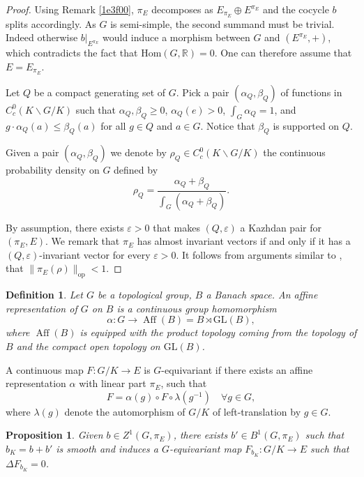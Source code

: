 \documentclass[12pt]{amsart}
\newtheorem{proposition}[theorem]{Proposition}
\newtheorem{definition}[theorem]{Definition}
\theoremstyle{definition}
\begin{document}
\begin{proof}
Using Remark \ref{1e3f00}, \(\pi_{E}\) decomposes as
\(E_{\pi_{E}}\oplus E^{\pi_{E}}\) and the cocycle \(b\) splits
accordingly. As \(G\) is semi-simple, the second summand must be
trivial. Indeed otherwise \(b|_{E^{\pi_{E}}}\) would induce a morphism
between \(G\) and \((E^{\pi_{E}},+)\), which contradicts the fact that
\(\mathrm{Hom}(G,\mathbb{R})=0\). One can therefore assume that
\(E=E_{\pi_{E}}\).

Let \(Q\) be a compact generating set of \(G\). Pick a pair
\((\alpha_Q,\beta_Q)\) of functions in \(C_c^0(K\backslash G/K)\) such
that \(\alpha_Q,\beta_Q\ge0\), \(\alpha_Q(e)>0\), \(\int_G\alpha_Q=1\),
and \(g \cdot \alpha_Q(a)\le \beta_Q(a)\) for all \(g\in Q\) and
\(a\in G\). Notice that \(\beta_Q\) is supported on \(Q\).

Given a pair \((\alpha_Q,\beta_Q)\) we denote by
\(\rho_Q\in C_c^0(K\backslash G/K)\) the continuous probability density
on \(G\) defined by
\[\rho_Q=\frac{\alpha_Q+\beta_Q}{\int_G(\alpha_Q+\beta_Q)}.\]

By assumption, there exists \(\varepsilon>0\) that makes
\((Q,\varepsilon)\) a Kazhdan pair for \((\pi_E,E)\). We remark that \(\pi_{E}\) has
almost invariant vectors if and only if it has a
\((Q, \varepsilon)\)-invariant vector for every \(\varepsilon>0\). It
follows from arguments similar to \cite[Theorem~3.4]{Drutu2019}, that
\(\|\pi_{E}(\rho)\|_{\mathrm{op}}<1\).

\end{proof}

\begin{definition}
Let \(G\) be a topological group, \(B\) a Banach space. An \emph{affine
representation} of \(G\) on \(B\) is a continuous group homomorphism
\[\alpha: G \rightarrow \operatorname{Aff}(B) = B \rtimes \mathrm{GL}(B),\]
where \(\operatorname{Aff}(B)\) is equipped with the product topology
coming from the topology of \(B\) and the compact open topology on
\(\mathrm{GL}(B)\).
\end{definition}

A continuous map \(F: G/K \to E\) is \(G\)-equivariant if there exists
an affine representation \(\alpha\) with linear part \(\pi_{E}\), such
that
\[F = \alpha(g) \circ F \circ \lambda(g^{-1}) \quad \forall g \in G,\]
where \(\lambda(g)\) denote the automorphism of \(G/K\) of
left-translation by \(g \in G\).


\begin{proposition}
\label{74e9c2}
Given \(b\in Z^1(G,\pi_{E})\), there exists \(b'\in B^1(G,\pi_{E})\)
such that \(b_{K} = b+b'\) is smooth and induces a \(G\)-equivariant map
\(F_{b_{K}}:G/K\rightarrow E\) such that \(\Delta F_{b_{K}}=0\).
\end{proposition}
\end{document}
